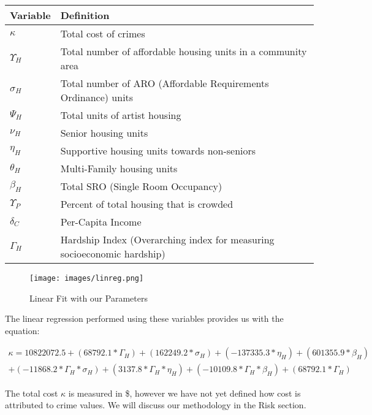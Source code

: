 \documentclass{article}
\begin{document}
\begin{onehalfspacing}
\begin{center}
\begin{tabular}{ | m{1in} | m{4in} | } 
  \hline
  Variable & Definition \\
  \hline \hline
  $\kappa$ & Total cost of crimes \\
  \hline
  $\Upsilon_H$ & Total number of affordable housing units in a community area \\
  \hline
  $\sigma_H$ & Total number of ARO (Affordable Requirements Ordinance) units \\
  \hline
  $\Psi_H$ & Total units of artist housing \\
  \hline
  $\nu_H$ & Senior housing units \\
  \hline
  $\eta_H$ & Supportive housing units towards non-seniors \\ 
  \hline
  $\theta_H$ & Multi-Family housing units \\
  \hline
  $\beta_H$ & Total SRO (Single Room Occupancy) \\
  \hline
  $\Upsilon_P$ & Percent of total housing that is crowded \\
  \hline
  $\delta_C$ & Per-Capita Income \\
  \hline
  $\Gamma_H$ & Hardship Index (Overarching index for measuring socioeconomic hardship) \\
  \hline
\end{tabular}
\end{center}

\begin{figure}[H]
    \centering
    \centerline{\texttt{[image: images/linreg.png]}}
    \caption{Linear Fit with our Parameters}
\end{figure}

The linear regression performed using these variables provides us with the equation:

\begin{multline*}
    \kappa = 10822072.5 + (68792.1 * \Gamma_H) + (162249.2 * \sigma_H) + (-137335.3 * \eta_H) + (601355.9 * \beta_H) \\
    + (-11868.2 * \Gamma_H * \sigma_H) + (3137.8 * \Gamma_H * \eta_H) + (-10109.8 * \Gamma_H * \beta_H) + (68792.1 * \Gamma_H)
\end{multline*}

The total cost $\kappa$ is measured in \$, however we have not yet defined how cost is attributed to crime values. We will discuss our methodology in the Risk section.


\end{onehalfspacing}
\end{document}
